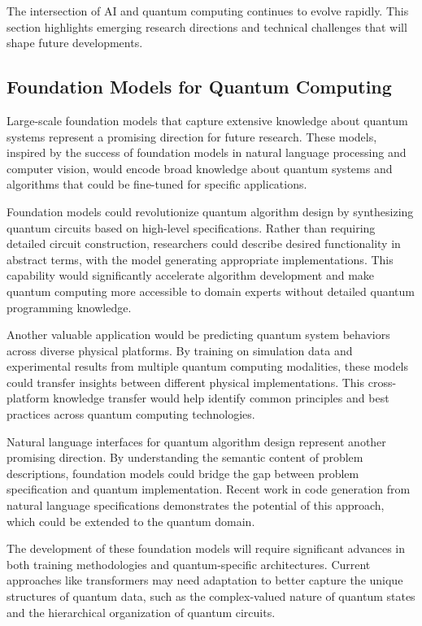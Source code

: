 The intersection of AI and quantum computing continues to evolve rapidly. This section highlights emerging research directions and technical challenges that will shape future developments.

\subsection{Foundation Models for Quantum Computing}

Large-scale foundation models that capture extensive knowledge about quantum systems represent a promising direction for future research. These models, inspired by the success of foundation models in natural language processing and computer vision, would encode broad knowledge about quantum systems and algorithms that could be fine-tuned for specific applications.

Foundation models could revolutionize quantum algorithm design by synthesizing quantum circuits based on high-level specifications. Rather than requiring detailed circuit construction, researchers could describe desired functionality in abstract terms, with the model generating appropriate implementations. This capability would significantly accelerate algorithm development and make quantum computing more accessible to domain experts without detailed quantum programming knowledge.

Another valuable application would be predicting quantum system behaviors across diverse physical platforms. By training on simulation data and experimental results from multiple quantum computing modalities, these models could transfer insights between different physical implementations. This cross-platform knowledge transfer would help identify common principles and best practices across quantum computing technologies.

Natural language interfaces for quantum algorithm design represent another promising direction. By understanding the semantic content of problem descriptions, foundation models could bridge the gap between problem specification and quantum implementation. Recent work in code generation from natural language specifications demonstrates the potential of this approach, which could be extended to the quantum domain.

The development of these foundation models will require significant advances in both training methodologies and quantum-specific architectures. Current approaches like transformers may need adaptation to better capture the unique structures of quantum data, such as the complex-valued nature of quantum states and the hierarchical organization of quantum circuits.

